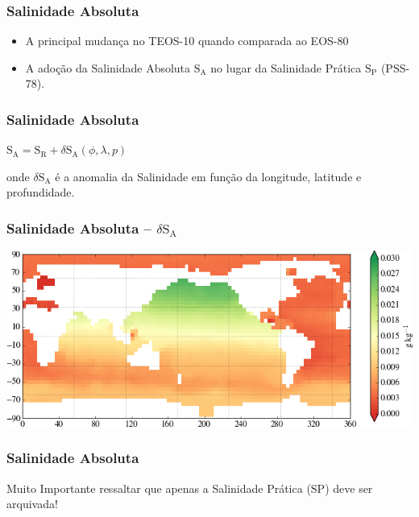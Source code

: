 \begin{frame}
\frametitle{Salinidade Absoluta}
    \begin{itemize}[<+-| alert@+>]
        \item A principal mudança no TEOS-10 quando comparada ao EOS-80
        \item A adoção da Salinidade Absoluta $\text{S}_\text{A}$ no lugar da
              Salinidade Prática $\text{S}_\text{P}$ (PSS-78).
    \end{itemize}
\end{frame}

\begin{frame}
\frametitle{Salinidade Absoluta}
    \begin{block}{}
        $\text{S}_\text{A} =
        \text{S}_\text{R} + \delta\text{S}_\text{A}(\phi, \lambda, p)$

        onde $\delta\text{S}_\text{A}$ é a anomalia da Salinidade em função da
        longitude, latitude e profundidade.
    \end{block}
\end{frame}

\begin{frame}
\frametitle{Salinidade Absoluta -- $\delta\text{S}_\text{A}$}
    \begin{center}
        \includegraphics[scale=0.5]{./figures/delta_SA.png}
    \end{center}
\end{frame}

\begin{frame}
\frametitle{Salinidade Absoluta}
    \begin{block}{}
        Muito Importante ressaltar que apenas a Salinidade Prática (SP) deve
        ser arquivada!
    \end{block}
\end{frame}


